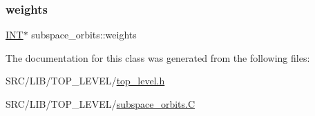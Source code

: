 \subsubsection{\texorpdfstring{weights}{weights}}
{\footnotesize\ttfamily \mbox{\hyperlink{galois_8h_a09fddde158a3a20bd2dcadb609de11dc}{I\+NT}}$\ast$ subspace\+\_\+orbits\+::weights}



The documentation for this class was generated from the following files\+:\begin{DoxyCompactItemize}
\item 
S\+R\+C/\+L\+I\+B/\+T\+O\+P\+\_\+\+L\+E\+V\+E\+L/\mbox{\hyperlink{top__level_8h}{top\+\_\+level.\+h}}\item 
S\+R\+C/\+L\+I\+B/\+T\+O\+P\+\_\+\+L\+E\+V\+E\+L/\mbox{\hyperlink{subspace__orbits_8_c}{subspace\+\_\+orbits.\+C}}\end{DoxyCompactItemize}
